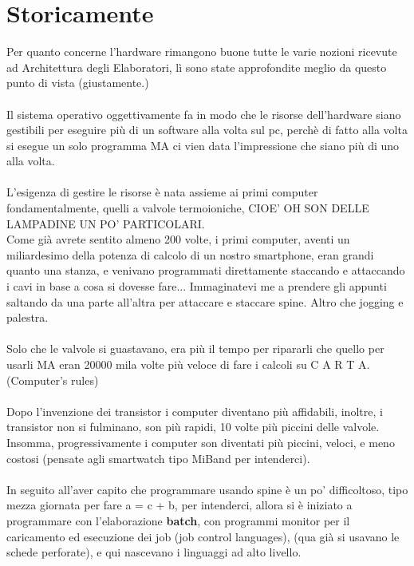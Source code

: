 \documentclass[12pt, a4paper, openany, twoside]{book}
\begin{document}
\section{Storicamente}
Per quanto concerne l'hardware rimangono buone tutte le varie nozioni ricevute
ad Architettura degli Elaboratori, lì sono state approfondite meglio da questo
punto di vista (giustamente.)\\ \\
Il sistema operativo oggettivamente fa in modo che le risorse dell'hardware
siano gestibili per eseguire più di un software alla volta sul pc, perchè di fatto
alla volta si esegue un solo programma MA ci vien data l'impressione che siano
più di uno alla volta. \\ \\
L'esigenza di gestire le risorse è nata assieme ai primi computer fondamentalmente,
quelli a valvole termoioniche, CIOE' OH SON DELLE LAMPADINE UN PO' PARTICOLARI.\\
Come già avrete sentito almeno 200 volte, i primi computer, aventi un miliardesimo
della potenza di calcolo di un nostro smartphone, eran grandi quanto una stanza,
e venivano programmati direttamente staccando e attaccando i cavi in base a cosa
si dovesse fare... Immaginatevi me a prendere gli appunti saltando da una parte
all'altra per attaccare e staccare spine. Altro che jogging e palestra.
\\ \\
Solo che le valvole si guastavano, era più il tempo per ripararli che quello per
usarli MA eran 20000 mila volte più veloce di fare i calcoli su C A R T A. 
(Computer's rules)
\\ \\
Dopo l'invenzione dei transistor i computer diventano più affidabili, inoltre,
i transistor non si fulminano, son più rapidi, 10 volte più piccini delle valvole.
Insomma, progressivamente i computer son diventati più piccini, veloci, e meno
costosi (pensate agli smartwatch tipo MiBand per intenderci).
\\ \\
In seguito all'aver capito che programmare usando spine è un po' difficoltoso, 
tipo mezza giornata per fare a = c + b, per intenderci, allora si è iniziato
a programmare con l'elaborazione \textbf{batch}, con programmi monitor per il 
caricamento ed esecuzione dei job (job control languages), (qua già si usavano
le schede perforate), e qui nascevano i linguaggi ad alto livello.
\\ \\ 
\end{document}

